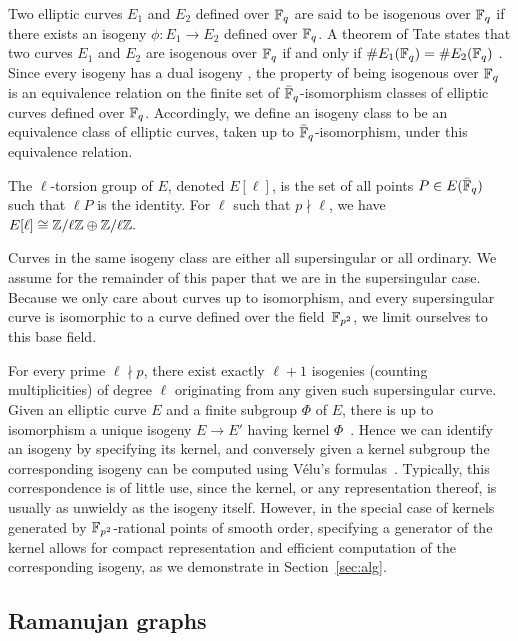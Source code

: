 Two elliptic curves $E_1$ and $E_2$ defined over ${\mathbb{F}}_q$ are said to
be isogenous over ${\mathbb{F}}_q$ if there exists an isogeny $\phi\colon E_1
\to E_2$ defined over ${\mathbb{F}}_q$. A theorem of Tate states that
two curves $E_1$ and $E_2$ are isogenous over ${\mathbb{F}}_q$ if and only if
$\#E_1({\mathbb{F}}_q) = \#E_2({\mathbb{F}}_q)$ \cite[$\S$3]{Tate}. Since every isogeny
has a dual isogeny \cite[III.6.1]{Sil}, the property of being
isogenous over ${\mathbb{F}}_q$ is an equivalence relation on the finite set of
$\bar{{\mathbb{F}}}_q$-isomorphism classes of elliptic curves defined over
${\mathbb{F}}_q$.  Accordingly, we define an isogeny class to be an equivalence
class of elliptic curves, taken up to $\bar{{\mathbb{F}}}_q$-isomorphism, under
this equivalence relation.

The $\ell$-torsion group of $E$, denoted $E[\ell]$, is the set of all
points $P \in E(\bar{{\mathbb{F}}}_q)$ such that $\ell P$ is the identity. For
$\ell$ such that $p\nmid \ell$, we have $E[\ell] \cong {\mathbb{Z}}/\ell{\mathbb{Z}} \oplus
{\mathbb{Z}}/\ell{\mathbb{Z}}.$

Curves in the same isogeny class are either all supersingular or all
ordinary. 
We assume for the remainder of this paper that
we are in the supersingular case. Because we only care about curves
up to isomorphism, and every supersingular curve is
isomorphic to a curve defined over the field~${\mathbb{F}}_{p^2}$, we limit
ourselves to this base field.

For every
prime $\ell \nmid p$, there exist exactly $\ell+1$ isogenies (counting
multiplicities) of degree $\ell$ originating from any given such
supersingular curve.
Given an elliptic curve $E$ and a finite subgroup $\Phi$ of $E$, there
is up to isomorphism a unique isogeny $E \to E'$ having kernel
$\Phi$~\cite[III.4.12]{Sil}. Hence we can identify an isogeny by
specifying its kernel, and conversely given a kernel subgroup the
corresponding isogeny can be computed using V\'elu's
formulas~\cite{velu71}. Typically, this correspondence is of little use,
since the kernel, or any representation thereof, is usually as
unwieldy as the isogeny itself. However, in the special case of
kernels generated by ${\mathbb{F}}_{p^2}$-rational points of smooth order,
specifying a generator of the kernel allows for compact representation
and efficient computation of the corresponding isogeny, as we
demonstrate in Section~\ref{sec:alg}.


\subsection{Ramanujan graphs}\label{ram_graph} 

